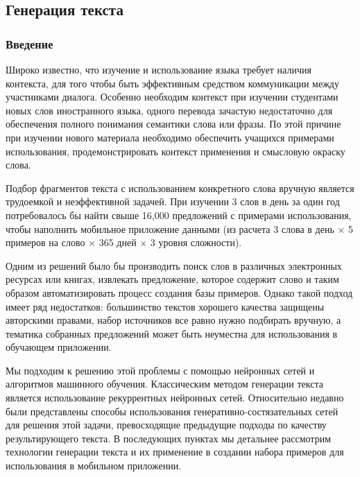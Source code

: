 \subsection{Генерация текста}

\subsubsection{Введение}
Широко известно, что изучение и использование языка требует наличия контекста, для того чтобы быть эффективным средством коммуникации между участниками диалога. Особенно необходим контекст при изучении студентами новых слов иностранного языка, одного перевода зачастую недостаточно для обеспечения полного понимания семантики слова или фразы. По этой причине при изучении нового материала необходимо обеспечить учащихся примерами использования, продемонстрировать контекст применения и смысловую окраску слова.

Подбор фрагментов текста с использованием конкретного слова вручную является трудоемкой и неэффективной задачей. При изучении 3 слов в день за один год потребовалось бы найти свыше 16,000 предложений с примерами использования, чтобы наполнить мобильное приложение данными (из расчета 3 слова в день $\times$ 5 примеров на слово $\times$ 365 дней $\times$ 3 уровня сложности).

Одним из решений было бы производить поиск слов в различных электронных ресурсах или книгах, извлекать предложение, которое содержит слово и таким образом автоматизировать процесс создания базы примеров. Однако такой подход имеет ряд недостатков: большинство текстов хорошего качества защищены авторскими правами, набор источников все равно нужно подбирать вручную, а тематика собранных предложений может быть неуместна для использования в обучающем приложении.

Мы подходим к решению этой проблемы с помощью нейронных сетей и алгоритмов машинного обучения. Классическим методом генерации текста является использование рекуррентных нейронных сетей. Относительно недавно были представлены способы использования генеративно-состязательных сетей для решения этой задачи, превосходящие предыдущие подходы по качеству результирующего текста. В последующих пунктах мы детальнее рассмотрим технологии генерации текста и их применение в создании набора примеров для использования в мобильном приложении.

